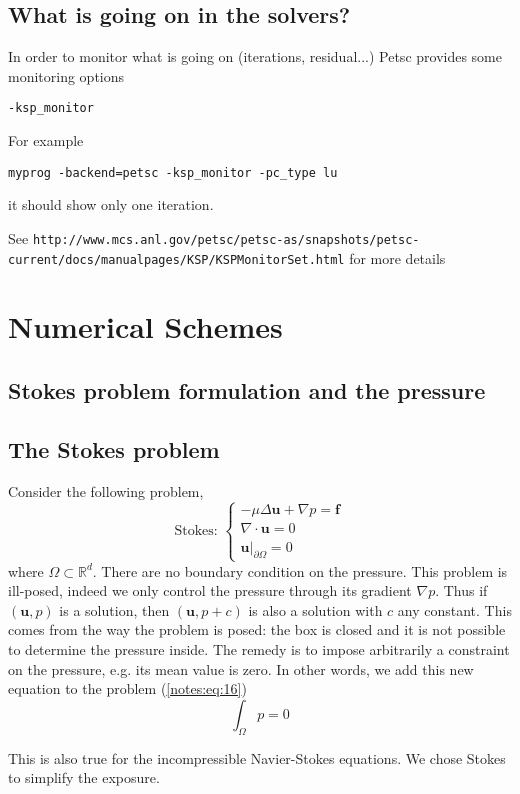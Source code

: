 \subsection{What is going on in the solvers?}
\label{sec:what-going-solvers}

In order to monitor what is going on (iterations, residual...) Petsc
provides some monitoring options
\begin{verbatim}
-ksp_monitor
\end{verbatim}
For example
\begin{verbatim}
myprog -backend=petsc -ksp_monitor -pc_type lu
\end{verbatim}
it should show only one iteration.

See {\tiny\texttt{http://www.mcs.anl.gov/petsc/petsc-as/snapshots/petsc-current/docs/manualpages/KSP/KSPMonitorSet.html}} for more details

\section{Numerical Schemes}
\label{sec:numerical-schemes}

\subsection{Stokes problem formulation and the pressure}
\label{sec:stok-probl-form}

\subsection{The Stokes problem}
\label{sec:stokes-problem}

Consider the following problem,
\begin{equation}
  \label{notes:eq:16}
  \mbox{Stokes: }\left\{
    \begin{array}{rcc}
      -\mu\Delta\mathbf{u} +
      \nabla p =
      \mathbf{f}\\
      \nabla\cdot\mathbf{u} = 0\\
      \mathbf{u}|_{\partial \Omega} = 0
    \end{array}
  \right.
\end{equation}
where $\Omega \subset \mathbb{R}^d$. There are no boundary condition
on the pressure. This problem is ill-posed, indeed we only control the
pressure through its gradient $\nabla p$. Thus if $(\mathbf{u},p)$ is
a solution, then $(\mathbf{u},p+c)$ is also a solution with $c$ any
constant. This comes from the way the problem is posed: the box is
closed and it is not possible to determine the pressure inside. The
remedy is to impose arbitrarily a constraint on the pressure, e.g. its
mean value is zero. In other words, we add this new equation to the
problem (\ref{notes:eq:16})
\begin{equation}
  \label{notes:eq:17}
  \int_\Omega p = 0
\end{equation}
\begin{remark}
  This is also true for the incompressible Navier-Stokes equations. We
  chose Stokes to simplify the exposure.
\end{remark}

